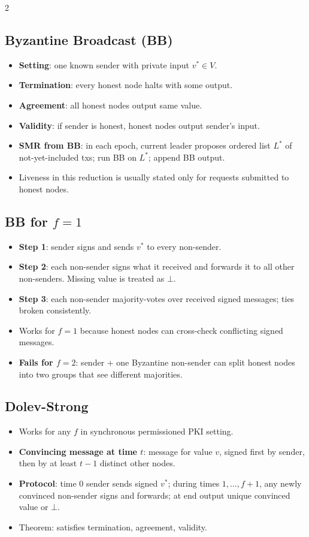 \documentclass[10pt,a4paper]{article}
\newcommand{\term}[1]{\textbf{#1}}
\newcommand{\imp}[1]{\textbf{#1}}
\begin{document}
\begin{multicols*}{2}
\subsection*{Byzantine Broadcast (BB)}
\begin{itemize}
\item \term{Setting}: one known sender with private input $v^* \in V$.
\item \term{Termination}: every honest node halts with some output.
\item \term{Agreement}: all honest nodes output same value.
\item \term{Validity}: if sender is honest, honest nodes output sender's input.
\item \term{SMR from BB}: in each epoch, current leader proposes ordered list $L^*$ of not-yet-included txs; run BB on $L^*$; append BB output.
\item Liveness in this reduction is usually stated only for requests submitted to honest nodes.
\end{itemize}

\subsection*{BB for $f=1$}
\begin{itemize}
\item \term{Step 1}: sender signs and sends $v^*$ to every non-sender.
\item \term{Step 2}: each non-sender signs what it received and forwards it to all other non-senders. Missing value is treated as $\bot$.
\item \term{Step 3}: each non-sender majority-votes over received signed messages; ties broken consistently.
\item Works for $f=1$ because honest nodes can cross-check conflicting signed messages.
\item \imp{Fails for $f=2$}: sender + one Byzantine non-sender can split honest nodes into two groups that see different majorities.
\end{itemize}

\subsection*{Dolev-Strong}
\begin{itemize}
\item Works for any $f$ in synchronous permissioned PKI setting.
\item \term{Convincing message at time $t$}: message for value $v$, signed first by sender, then by at least $t-1$ distinct other nodes.
\item \term{Protocol}: time 0 sender sends signed $v^*$; during times $1,\dots,f+1$, any newly convinced non-sender signs and forwards; at end output unique convinced value or $\bot$.
\item Theorem: satisfies termination, agreement, validity.
\end{itemize}


\end{multicols*}
\end{document}
